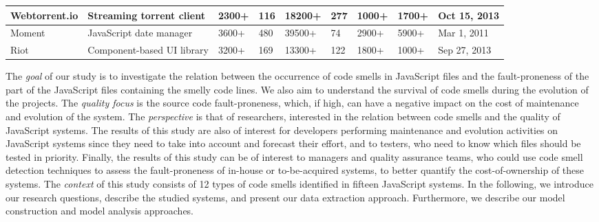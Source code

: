 \documentclass[smallcondensed]{svjour3}
\begin{document}
\begin{table}[!htbp]
{\begin{tabular}{l|l|l|l|l|l|l|l|l}
Webtorrent.io & Streaming torrent client & 2300+	 & 116			   & 18200+			 & 277		   & 1000+			  & 1700+	 & Oct 15, 2013		   \\ \hline
Moment	 & JavaScript date manager  & 3600+		 & 480			   & 39500+			 & 74		   & 2900+			  & 5900+ 	 & Mar 1, 2011			   \\ \hline
Riot	 & Component-based UI library & 3200+ 	 & 169			   & 13300+			 & 122 		   & 1800+			  & 1000+	 & Sep 27, 2013		   \\ \hline
\end{tabular}
}
\vspace{-15pt}
\end{table}

The \emph{goal} of our study is to investigate the relation between the occurrence of code smells in JavaScript files and the fault-proneness of the part of the JavaScript files containing the smelly code lines. We also aim to understand the survival of code smells during the evolution of the projects. The \emph{quality focus} is the source code fault-proneness, which, if high, can have a negative impact on the cost of maintenance and evolution of the system. The \emph{perspective} is that of researchers, interested in the relation between code smells and the quality of JavaScript systems. The results of this study are also of interest for developers performing maintenance and evolution activities on JavaScript systems since they need to take into account and forecast their effort, and to testers, who need to know which files should be tested in priority. Finally, the results of this study can be of interest to managers and quality assurance teams, who could use code smell detection techniques to assess the fault-proneness of in-house or to-be-acquired systems, to better quantify the cost-of-ownership of these systems. The \emph{context} of this study consists of 12 types of code smells identified in fifteen JavaScript systems. In the following, we introduce our research questions, describe the studied systems, and present our data extraction approach. Furthermore, we describe our model construction and model analysis approaches.
\end{document}
